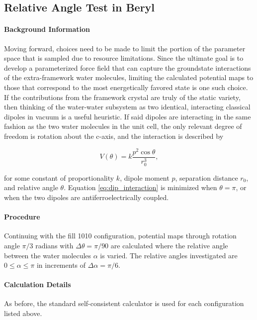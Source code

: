         \subsection{Relative Angle Test in Beryl}
        \label{sec:rel_ang_Test}
        
        \paragraph{Background Information }Moving forward, choices need to be made to limit the portion of the parameter space that is sampled due to resource limitations. Since the ultimate goal is to develop a parameterized force field that can capture the groundstate interactions of the extra-framework water molecules, limiting the calculated potential maps to those that correspond to the most energetically favored state is one such choice. If the contributions from the framework crystal are truly of the static variety, then thinking of the water-water subsystem as two identical, interacting classical dipoles in vacuum is a useful heuristic. If said dipoles are interacting in the same fashion as the two water molecules in the unit cell, the only relevant degree of freedom is rotation about the c-axis, and the interaction is described by
        
        \begin{equation}
        \label{eq:dip_interaction}
            V(\theta) = k\frac{p^2\cos \theta}{r_0^3},
        \end{equation}
        
        \noindent for some constant of proportionality $k$, dipole moment $p$, separation distance $r_0$, and relative angle $\theta$. Equation \ref{eq:dip_interaction} is minimized when $\theta = \pi$, or when the two dipoles are antiferroelectrically coupled. 
        
        \paragraph{Procedure} Continuing with the fill 1010 configuration, potential maps through rotation angle $\pi/3$ radians with $\Delta \theta = \pi/90$ are calculated where the relative angle between the water molecules $\alpha$ is varied. The relative angles investigated are $0 \le \alpha \le \pi$ in increments of $\Delta \alpha = \pi/6$.
        
        \paragraph{Calculation Details} As before, the standard self-consistent calculator is used for each configuration listed above.
        

